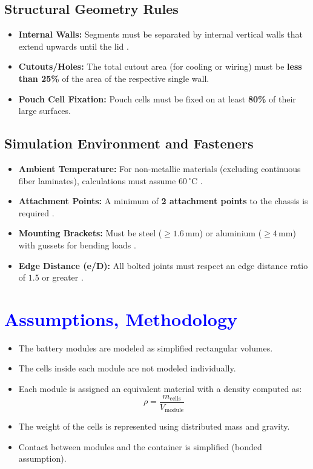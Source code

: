 \documentclass[a4paper,12pt]{article}
\begin{document}
\subsection{Structural Geometry Rules}
\begin{itemize}
	\item \textbf{Internal Walls:} Segments must be separated by internal vertical walls that extend upwards until the lid .
	\item \textbf{Cutouts/Holes:} The total cutout area (for cooling or wiring) must be \textbf{less than 25\%} of the area of the respective single wall.
	\item \textbf{Pouch Cell Fixation:} Pouch cells must be fixed on at least \textbf{80\%} of their large surfaces.
\end{itemize}

\subsection{Simulation Environment and Fasteners}
\begin{itemize}
	\item \textbf{Ambient Temperature:} For non-metallic materials (excluding continuous fiber laminates), calculations must assume \textbf{$60\,^\circ\text{C}$} .
	\item \textbf{Attachment Points:} A minimum of \textbf{2 attachment points} to the chassis is required .
	\item \textbf{Mounting Brackets:} Must be steel ($\ge 1.6\,\text{mm}$) or aluminium ($\ge 4\,\text{mm}$) with gussets for bending loads .
	\item \textbf{Edge Distance (e/D):} All bolted joints must respect an edge distance ratio of \textbf{$1.5$} or greater .
\end{itemize}




\vspace*{2cm}


\section{ \textcolor{blue}{Assumptions, Methodology} }

\begin{itemize}
	\item The battery modules are modeled as simplified rectangular volumes.
	\item The cells inside each module are not modeled individually.
	\item Each module is assigned an equivalent material with a density computed as:
	\[
	\rho = \frac{m_{\text{cells}}}{V_{\text{module}}}
	\]
	\item The weight of the cells is represented using distributed mass and gravity.
	\item Contact between modules and the container is simplified (bonded assumption).
\end{itemize}
\end{document}
